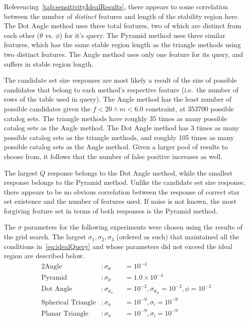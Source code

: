 Referencing~\autoref{tab:sensitivityIdealResults}, there appears to some correlation between the number of
\textit{distinct} features and length of the stability region here.
The Dot Angle method uses three total features, two of which are distinct from each other ($\theta$ vs. $\phi$) for
it's query.
The Pyramid method uses three similar features, which has the same stable region length as the triangle methods
using two distinct features.
The Angle method uses only one feature for its query, and suffers in stable region length.

The candidate set size responses are most likely a result of the size of possible candidates that belong to each
method's respective feature (i.e.\ the number of rows of the table used in query).
The Angle method has the least number of possible candidates given the $f < 20 \land m < 6.0$ constraint, at 353700
possible catalog sets.
The triangle methods have roughly 35 times as many possible catalog sets as the Angle method.
The Dot Angle method has 3 times as many possible catalog sets as the triangle methods, and roughly 105 times as many
possible catalog sets as the Angle method.
Given a larger pool of results to choose from, it follows that the number of false positive increases as well.

The largest $Q$ response belongs to the Dot Angle method, while the smallest response belongs to the Pyramid method.
Unlike the candidate set size response, there appears to be no obvious correlation between the response of correct
star set existence and the number of features used.
If noise is not known, the most forgiving feature set in terms of both responses is the Pyramid method.

The $\sigma$ parameters for the following experiments were chosen using the results of the grid search.
The largest $\sigma_1, \sigma_2, \sigma_3$ (ordered as such) that maintained all the conditions in~\autoref{eq:idealQuery} and whose
parameters did not exceed the ideal region are described below.
\begin{alignat*}{2}
    \text{Angle}&: \sigma_\theta &&= 10^{-4}\\
    \text{Pyramid}&: \sigma_\theta &&= 1.0 \times 10^{-4}\\
    \text{Dot Angle}&: \sigma_{\theta_{ic}} &&= 10^{-2}, \sigma_{\theta_{jc}} = 10^{-2}, \phi = 10^{-2} \\
    \text{Spherical Triangle}&: \sigma_a &&= 10^{-9}, \sigma_\imath = 10^{-9} \\
    \text{Planar Triangle}&: \sigma_a &&= 10^{-9}, \sigma_\imath = 10^{-9}
\end{alignat*}

